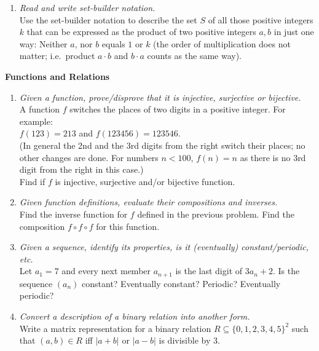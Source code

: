 \documentclass[a4paper,12pt]{article}
\begin{document}
\begin{enumerate}
\item {\small \em Read and write set-builder notation.}\\
Use the set-builder notation to describe the set $S$ of all those positive integers $k$ that can be expressed
as the product of two positive integers $a,b$ in just one way: Neither $a$, nor $b$ equals $1$ or $k$
(the order of multiplication does not matter; i.e.\ product $a \cdot b$ and $b \cdot a$ counts as the same way).
\end{enumerate}



\vspace{10pt}
{\bf Functions and Relations}

\begin{enumerate}
\item {\small \em Given a function, prove/disprove that it is injective, surjective or bijective.}\\
A function $f$ switches the places of two digits in a positive integer. For example:\\
$f(123) = 213$ and $f(123456) = 123546$.\\
(In general the 2nd and the 3rd digits from the right switch their places; no other changes are done.
For numbers $n < 100$, $f(n) = n$ as there is no 3rd digit from the right in this case.)\\
Find if $f$ is injective, surjective and/or bijective function.

\item {\small \em Given function definitions, evaluate their compositions and inverses.}\\
Find the inverse function for $f$ defined in the previous problem.
Find the composition $f \circ f \circ f$ for this function.


\item {\small \em Given a sequence, identify its properties, is it (eventually) constant/periodic, etc.}\\
Let $a_1 = 7$ and every next member $a_{n+1}$ is the last digit of $3a_n +2$.
Is the sequence $(a_n)$ constant? Eventually constant? Periodic? Eventually periodic?


\item {\small \em Convert a description of a binary relation into another form.}\\
Write a matrix representation for a binary relation $R \subseteq \{ 0,1,2,3,4,5 \}^2$ such
that $(a,b) \in R$ iff $|a + b|$ or $|a - b|$ is divisible by $3$.


\end{enumerate}
\end{document}
